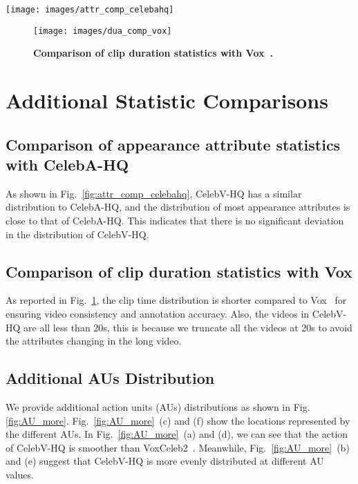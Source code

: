 \documentclass[runningheads]{llncs}
\begin{document}
\begin{figure*}[t]
\centering
\texttt{[image: images/attr\_comp\_celebahq]}
\caption{\textbf{Comparison of appearance attribute statistics with CelebA-HQ~\cite{celebahq}.} Please zoom in for more details.}
\label{fig:attr_comp_celebahq}
\vspace{-4mm}
\end{figure*}


\begin{figure}[t]
\centering
\texttt{[image: images/dua\_comp\_vox]}
\caption{\textbf{Comparison of clip duration statistics with Vox~\cite{vox17}.} }
\label{fig:dua_comp_vox}
\vspace{-4mm}
\end{figure}

\section{Additional Statistic Comparisons}
\subsection{Comparison of appearance attribute statistics with CelebA-HQ}
As shown in Fig.~\ref{fig:attr_comp_celebahq}, CelebV-HQ has a similar distribution to CelebA-HQ, and the distribution of most appearance attributes is close to that of CelebA-HQ. This indicates that there is no significant deviation in the distribution of CelebV-HQ.
 
\subsection{Comparison of clip duration statistics with Vox}
As reported in Fig.~\ref{fig:dua_comp_vox}, the clip time distribution is shorter compared to Vox~\cite{vox17} for ensuring video consistency and annotation accuracy. Also, the videos in CelebV-HQ are all less than 20s, this is because we truncate all the videos at 20s to avoid the attributes changing in the long video. 


\subsection{Additional AUs Distribution}
\label{sec:additional_au}
We provide additional action units (AUs) distributions as shown in Fig.\ref{fig:AU_more}. Fig.~\ref{fig:AU_more}~(c) and (f) show the locations represented by the different AUs. 
In Fig.~\ref{fig:AU_more}~(a) and (d), we can see that the action of CelebV-HQ is smoother than VoxCeleb2~\cite{vox2}. Meanwhile, Fig.~\ref{fig:AU_more}~(b) and (e) suggest that CelebV-HQ is more evenly distributed at different AU values. 
\end{document}
